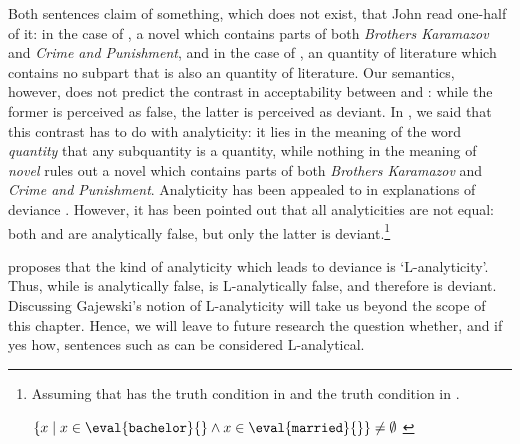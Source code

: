 \documentclass[output=paper]{langscibook}
\begin{document}
\noindent Both sentences claim of something, which does not exist, that John read one-half of it: in the case of , a novel which contains parts of both \textit{ Brothers Karamazov} and \textit{ Crime and Punishment}, and in the case of , an quantity of literature which contains no subpart that is also an quantity of literature. Our semantics, however, does not predict the contrast in acceptability between  and : while the former is perceived as false, the latter is perceived as deviant. In , we said that this contrast has to do with analyticity: it lies in the meaning of the word \textit{quantity} that any subquantity is a quantity, while nothing in the meaning of \textit{novel} rules out a novel which contains parts of both \textit{ Brothers Karamazov} and \textit{ Crime and Punishment}. Analyticity has been appealed to in explanations of deviance \citep[cf.][]{Barwise:1981, vonFintel:1993, krifka1995semantics, abrusan2007contradiction}. However, it has been pointed out that all analyticities are not equal: both  and  are analytically false, but only the latter is deviant.\footnote{Assuming that  has the truth condition in  \citep[cf.][]{heimkratzer1998semantics} and  the truth condition in  \citep[cf.][]{vonFintel:1993}.

\ea
\ea $\{x \mid x \in \eval{\texttt{bachelor}}{} \wedge x \in \eval{\texttt{married}}{}\} \neq \emptyset$
\label{hai-tri:tcbachelors} 
\label{hai-tri:tcexceptive}
\z
\z
} 

\ea 
{}
\label{hai-tri:bachelors}
\label{hai-tri:exceptive} 
\z
\z

\noindent \citet{gajewski2003analyticity} proposes that the kind of analyticity which leads to deviance is `L-analyticity'. Thus, while  is analytically false,  is L-analytically false, and therefore is deviant. Discussing Gajewski's notion of L-analyticity will take us beyond the scope of this chapter. Hence, we will leave to future research the question whether, and if yes how, sentences such as  can be considered L-analytical.
\end{document}
